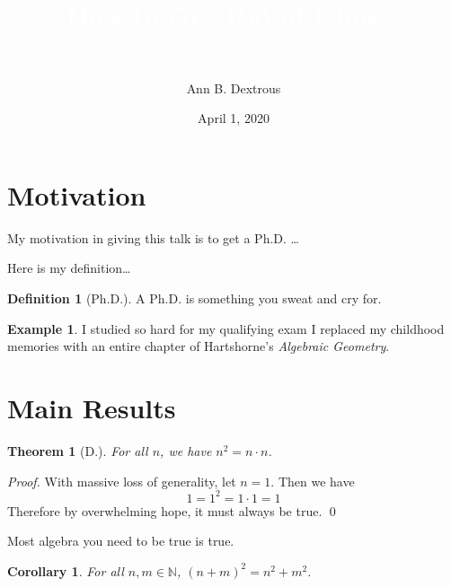 \documentclass{beamer}	%
\title{\textcolor{white}{How to Get Rid of Ghosts}}
\subtitle{\textcolor{white}{Mathematics Conference for the Mysterious and Magical}}
\author{Ann B. Dextrous}
\date{April 1, 2020}
\newcommand{\N}{\mathbb{N}}
\newcommand{\pf}{\noindent\emph{Proof. }}
\theoremstyle{plain}
\newtheorem{thm}{Theorem}[section]
\newtheorem{cor}{Corollary}[section]
\theoremstyle{definition}
\newtheorem{ex}{Example}[section]
\newtheorem{dfn}{Definition}[section]
\theoremstyle{remark}
\numberwithin{equation}{section}
\begin{document}
\begin{frame}
\titlepage
\end{frame}



\section{Motivation}



\begin{frame}
My motivation in giving this talk is to get a Ph.D. \dots
\end{frame}



\begin{frame}
Here is my definition\dots

\begin{dfn}[Ph.D.]
A Ph.D. is something you sweat and cry for.
\end{dfn}

\begin{ex}
I studied so hard for my qualifying exam I replaced my childhood memories with an entire chapter of Hartshorne's \emph{Algebraic Geometry}.
\end{ex}
\end{frame}



\section{Main Results}



\begin{frame}
\begin{thm}[D.]
For all $n$, we have $n^2= n \cdot n$.
\end{thm}

\pf With massive loss of generality, let $n=1$. Then we have
	\[
	1=1^2= 1 \cdot 1= 1
	\]
Therefore by overwhelming hope, it must always be true. \qed
\end{frame}



\begin{frame}
Most algebra you need to be true is true.
\begin{cor}
For all $n,m \in \N$, $(n+m)^2= n^2 + m^2$.
\end{cor}
\end{frame}
\end{document}
